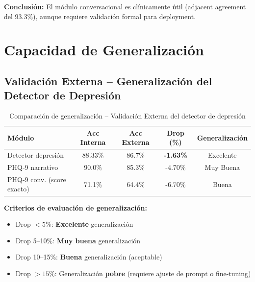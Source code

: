 \textbf{Conclusión:} El módulo conversacional es clínicamente útil (adjacent agreement
del 93.3\%), aunque requiere validación formal para deployment.

\section{Capacidad de Generalización}

\subsection{Validación Externa -- Generalización del Detector de Depresión}

\begin{table}[H]
\centering
\caption{Comparación de generalización -- Validación Externa del detector de depresión}
\label{tab:comparison_external}
\begin{tabular}{lcccc}
\toprule
\textbf{Módulo}              & \textbf{Acc Interna} & \textbf{Acc Externa} & \textbf{Drop (\%)} & \textbf{Generalización} \\
\midrule
Detector depresión           & 88.33\%              & 86.7\%               & \textbf{-1.63\%}   & Excelente   \\
PHQ-9 narrativo              & 90.0\%               & 85.3\%               & -4.70\%            & Muy Buena   \\
PHQ-9 conv. (score exacto)   & 71.1\%               & 64.4\%               & -6.70\%            & Buena       \\
\bottomrule
\end{tabular}
\end{table}

\textbf{Criterios de evaluación de generalización:}
\begin{itemize}
    \item Drop $< 5\%$: \textbf{Excelente} generalización
    \item Drop 5–10\%: \textbf{Muy buena} generalización
    \item Drop 10–15\%: \textbf{Buena} generalización (aceptable)
    \item Drop $> 15\%$: Generalización \textbf{pobre} (requiere ajuste de prompt o fine-tuning)
\end{itemize}

